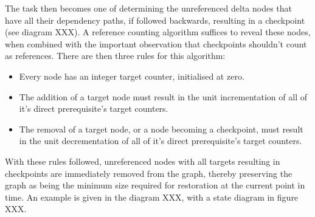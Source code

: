 \documentclass[10pt, a4paper]{article}
\begin{document}
The task then becomes one of determining the unreferenced delta nodes that have all their dependency paths, if followed backwards, resulting in a checkpoint (see diagram XXX).
A reference counting algorithm suffices to reveal these nodes, when combined with the important observation that checkpoints shouldn't count as references.
There are then three rules for this algorithm:
\begin{itemize}
	\item Every node has an integer target counter, initialised at zero.
	\item The addition of a target node must result in the unit incrementation of all of it's direct prerequisite's target counters.
	\item The removal of a target node, or a node becoming a checkpoint, must result in the unit decrementation of all of it's direct prerequisite's target counters.
\end{itemize}
With these rules followed, unreferenced nodes with all targets resulting in checkpoints are immediately removed from the graph, thereby preserving the graph as being the minimum size required for restoration at the current point in time.
An example is given in the diagram XXX, with a state diagram in figure XXX.

\end{document}
